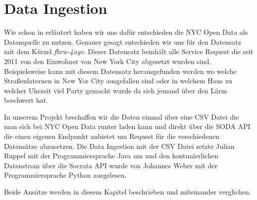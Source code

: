 \section{Data Ingestion}

Wie schon in  erläutert haben wir uns dafür entschieden die NYC Open Data als Datenquelle zu nutzen.
Genauer gesagt entschieden wir uns für den Datensatz mit dem Kürzel \textit{fhrw-4uyv}.
Dieser Datensatz beinhält alle Service Request die seit 2011 von den Einwohner von New York City abgesetzt wurden sind.
Beispielsweise kann mit diesem Datensatz herausgefunden werden wo welche Straßenlaternen in New Yor City ausgefallen sind
oder in welchem Haus zu welcher Uhrzeit viel Party gemacht wurde da sich jemand über den Lärm beschwert hat.

In unserem Projekt beschaffen wir die Daten einmal über eine \ac{CSV} Datei die man sich bei NYC Open Data runter laden kann
und direkt über die \ac{SODA} \ac{API} die einen eigenen Endpunkt anbietet um Request für die verschiedenen Datensätze abzusetzen.
Die Data Ingestion mit der \ac{CSV} Datei setzte Julian Ruppel mit der Programmiersprache Java um und
den kontunierlichen Datenstrom über die Socrata \ac{API} wurde von Johannes Weber mit der Programmiersprache Python
ausgelesen.

Beide Ansätze werden in diesem Kapitel beschrieben und miteinander verglichen.



